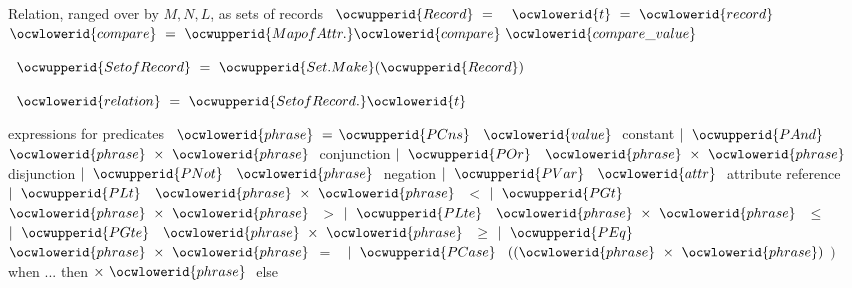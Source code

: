 \documentclass[12pt]{article}
\begin{document}
\ocwendcode{}\ocwindent{0.00em}
Relation, ranged over by $M, N, L$, as sets of records  
\ocweol
\label{rellens_types.ml:790}%
\medskip
\ocwbegincode{}\ocwindent{0.00em}
~$\ocwupperid{Record}~=~$\ocweol
\ocwindent{1.00em}
~$\ocwlowerid{t}~=~\ocwlowerid{record}$\ocweol
\ocwindent{1.00em}
~$\ocwlowerid{compare}~=~\ocwupperid{MapofAttr.}\ocwlowerid{compare}~\ocwlowerid{compare\_value}$\ocweol
\ocwindent{0.00em}
\medskip

\label{rellens_types.ml:884}%
\ocwindent{0.00em}
~$\ocwupperid{SetofRecord}~=~\ocwupperid{Set.Make}(\ocwupperid{Record})$\medskip

\label{rellens_types.ml:923}%
\ocwindent{0.00em}
~$\ocwlowerid{relation}~=~\ocwupperid{SetofRecord.}\ocwlowerid{t}$\medskip

\ocwendcode{}\ocwindent{0.00em}
expressions for predicates  
\ocweol
\label{rellens_types.ml:988}%
\medskip
\ocwbegincode{}\ocwindent{0.00em}
~$\ocwlowerid{phrase}~=$\ocweol
\ocwindent{1.50em}
$\ocwupperid{PCns}~$~$\ocwlowerid{value}~$\ocwbc{} constant \ocwec{}\ocweol
\ocwindent{0.50em}
$\mid{}~\ocwupperid{PAnd}~$~$\ocwlowerid{phrase}~\times{}~\ocwlowerid{phrase}~$\ocwbc{} conjunction \ocwec{}\ocweol
\ocwindent{0.50em}
$\mid{}~\ocwupperid{POr}~$~$\ocwlowerid{phrase}~\times{}~\ocwlowerid{phrase}~$\ocwbc{} disjunction \ocwec{}\ocweol
\ocwindent{0.50em}
$\mid{}~\ocwupperid{PNot}~$~$\ocwlowerid{phrase}~$\ocwbc{} negation \ocwec{}\ocweol
\ocwindent{0.50em}
$\mid{}~\ocwupperid{PVar}~$~$\ocwlowerid{attr}~$\ocwbc{} attribute reference \ocwec{}\ocweol
\ocwindent{0.50em}
$\mid{}~\ocwupperid{PLt}~$~$\ocwlowerid{phrase}~\times{}~\ocwlowerid{phrase}~$\ocwbc{} $<$  \ocwec{}\ocweol
\ocwindent{0.50em}
$\mid{}~\ocwupperid{PGt}~$~$\ocwlowerid{phrase}~\times{}~\ocwlowerid{phrase}~$\ocwbc{} $>$  \ocwec{}\ocweol
\ocwindent{0.50em}
$\mid{}~\ocwupperid{PLte}~$~$\ocwlowerid{phrase}~\times{}~\ocwlowerid{phrase}~$\ocwbc{} $\le$  \ocwec{}\ocweol
\ocwindent{0.50em}
$\mid{}~\ocwupperid{PGte}~$~$\ocwlowerid{phrase}~\times{}~\ocwlowerid{phrase}~$\ocwbc{} $\ge$  \ocwec{}\ocweol
\ocwindent{0.50em}
$\mid{}~\ocwupperid{PEq}~$~$\ocwlowerid{phrase}~\times{}~\ocwlowerid{phrase}~$\ocwbc{} = \ocwec{}~\ocweol
\ocwindent{0.50em}
$\mid{}~\ocwupperid{PCase}~$\ocweol
\ocwindent{2.50em}
$((\ocwlowerid{phrase}~\times{}~\ocwlowerid{phrase})~$$)~$\ocwbc{} when ... then \ocwec{}\ocweol
\ocwindent{1.50em}
$\times{}~\ocwlowerid{phrase}~$\ocwbc{} else \ocwec{}\medskip
\end{document}
